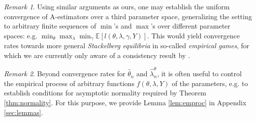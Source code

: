 \documentclass[12pt]{article}
\theoremstyle{myplain}
\theoremstyle{definition}
\theoremstyle{definition}
\theoremstyle{remark}
\newtheorem{remark}{Remark}[section]
\numberwithin{equation}{section}
\begin{document}
\begin{remark}
Using similar arguments as ours, one may establish the uniform convergence of A-estimators over a third parameter space, generalizing the setting to arbitrary finite sequences of $\min$'s and $\max$'s over different parameter spaces: e.g. $\min_\theta\max_\lambda\min_\gamma\mathbb{E}[l(\theta,\lambda,\gamma,Y)]$. This would yield convergence rates towards more general {\it Stackelberg equilibria} in so-called {\it empirical games}, for which we are currently only aware of a consistency result by \cite{tuyls2018generalised}.
\end{remark}
\begin{remark}
Beyond convergence rates for $\widehat{\theta}_n$ and $\widehat{\lambda}_n^\theta$, it is often useful to control the empirical process of arbitrary functions $f(\theta, \lambda, Y)$ of the parameters, e.g. to establish conditions for asymptotic normality required by Theorem \ref{thm:normality}. For this purpose, we provide Lemma \ref{lem:emproc} in Appendix \ref{sec:lemmas}.
\end{remark}
\end{document}
